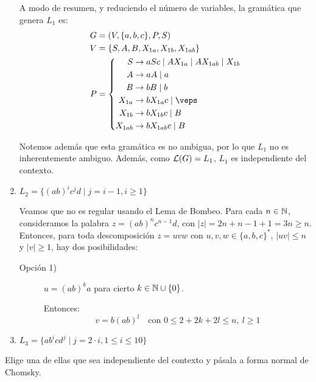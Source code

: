 \begin{ejercicio}
\begin{enumerate}
        A modo de resumen, y reduciendo el número de variables, la gramática que genera $L_1$ es:
        \begin{equation*}
            \begin{aligned}
                G &= (V,\{a,b,c\},P,S) \\
                V &= \{ S, A, B, X_{1a}, X_{1b}, X_{1ab} \} \\
                P &= \left\{
                    \begin{aligned}
                        S &\rightarrow aSc \mid A X_{1a} \mid A X_{1ab} \mid X_{1b}\\
                        A &\rightarrow aA \mid a\\
                        B &\rightarrow bB \mid b\\
                        X_{1a} &\rightarrow bX_{1a}c \mid \veps\\
                        X_{1b} &\rightarrow bX_{1b}c \mid B\\
                        X_{1ab} &\rightarrow bX_{1ab}c \mid B
                    \end{aligned}
                \right.
            \end{aligned}
        \end{equation*}
        
        Notemos además que esta gramática es no ambigua, por lo que $L_1$ no es inherentemente ambiguo. Además, como $\mathcal{L}(G)=L_1$, $L_1$ es independiente del contexto.

        \item $L_2 = \{ (ab)^i c^j d \mid j = i - 1, i \geq 1 \}$
        
        Veamos que no es regular usando el Lema de Bombeo. Para cada $n\in \mathbb{N}$, consideramos la palabra $z=(ab)^{n}c^{n-1}d$, con $|z|=2n+n-1+1=3n\geq n$. Entonces, para toda descomposición $z=uvw$ con $u,v,w\in \{a,b,c\}^*$, $|uv|\leq n$ y $|v|\geq 1$, hay dos posibilidades:
        \begin{description}
            \item[Opción 1)] $u=(ab)^k a$ para cierto $k\in \mathbb{N}\cup \{0\}$.
            
            Entonces:
            \begin{equation*}
                v=b(ab)^l \quad \text{con } 0\leq 2+2k+2l\leq n,~l\geq 1
            \end{equation*}
        \end{description}


        \item $L_3 = \{ ab^i cd^j \mid j = 2 \cdot i, 1 \leq i \leq 10 \}$
        
    \end{enumerate}
    Elige una de ellas que sea independiente del contexto y pásala a forma normal de Chomsky.
\end{ejercicio}

